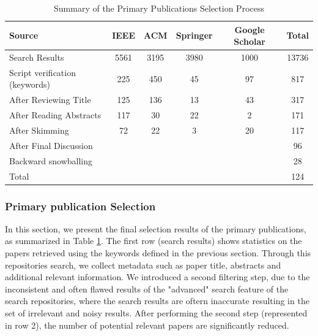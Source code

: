 \begin{table}
    \begin{tabular}{lccccc}
    \toprule
    Source                         & IEEE & ACM  & Springer & Google Scholar & Total \\
    \midrule
    Search Results                 & 5561 & 3195 & 3980     & 1000           & 13736 \\
    Script verification (keywords) & 225  & 450  & 45       & 97             & 817   \\
    After Reviewing Title          & 125   & 136  & 13       & 43             & 317   \\
    After Reading Abstracts        & 117  & 30   & 22       & 2              & 171   \\
    After Skimming                 & 72   & 22   & 3        & 20             & 117   \\
    After Final Discussion         &      &      &          &                & 96    \\
    Backward snowballing           &      &      &          &                & 28    \\
    Total                          &      &      &          &                & 124   \\ 
    \bottomrule
    \end{tabular}
    \caption{Summary of the Primary Publications Selection Process}
    \label{tab:summary_slr}
\end{table}

\subsubsection{Primary publication Selection}
In this section, we present the final selection results of the primary publications, as summarized in Table \ref{tab:summary_slr}.
The first row (search results) shows statistics on the papers retrieved using the keywords defined in the previous section. Through this repositories search, we collect metadata such as paper title, abstracts and additional relevant information.
We introduced a second filtering step, due to the inconsistent and often flawed results of the "advanced" search feature of the search repositories, where the search results are oftern inaccurate resulting in the set of irrelevant and noisy results. 
After performing the second step (represented in row 2), the number of potential relevant papers are significantly reduced.

    